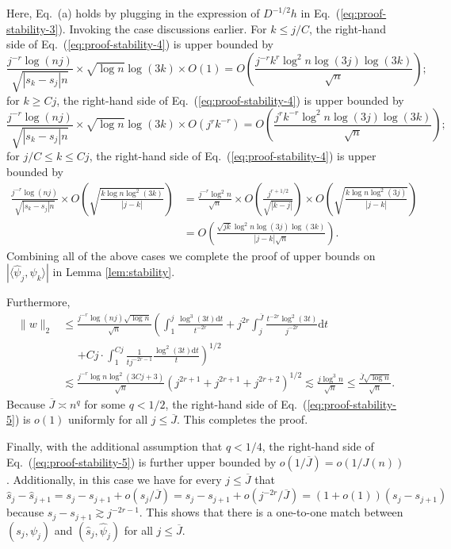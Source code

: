 \documentclass[11pt,a4paper]{article}
\renewcommand{\hat}{\widehat}
\renewcommand{\bar}{\overline}
\theoremstyle{definition}
\theoremstyle{plain}
\theoremstyle{remark}
\newcommand{\ud}{\mathrm d}
\begin{document}
Here, Eq.~(a) holds by plugging in the expression of $D^{-1/2}h$ in Eq.~(\ref{eq:proof-stability-3}).
Invoking the case discussions earlier. For $k\leq j/C$, the right-hand side of Eq.~(\ref{eq:proof-stability-4}) is upper bounded by
$$
 \frac{j^{-r}\log(nj)}{\sqrt{|s_k-s_j|n}}\times \sqrt{\log n}\log(3k)\times O(1) = O\left(\frac{j^{-r}k^r\log^2 n\log(3j)\log(3k)}{\sqrt{n}}\right);
$$
for $k\geq Cj$, the right-hand side of Eq.~(\ref{eq:proof-stability-4}) is upper bounded by 
$$
\frac{j^{-r}\log(nj)}{\sqrt{|s_k-s_j|n}} \times\sqrt{\log n}\log(3k)\times O(j^rk^{-r}) = O\left(\frac{j^rk^{-r}\log^2 n\log(3j)\log(3k)}{\sqrt{n}}\right);
$$
for $j/C\leq k\leq Cj$, the right-hand side of Eq.~(\ref{eq:proof-stability-4}) is upper bounded by
\begin{align*}
\frac{j^{-r}\log(nj)}{\sqrt{|s_k-s_j|n}}\times O\left(\sqrt{\frac{k\log n\log^2(3k)}{|j-k|}}\right) &= \frac{j^{-r}\log^2 n}{\sqrt{n}}\times O\left(\frac{j^{r+1/2}}{\sqrt{|k-j|}}\right)\times O\left(\sqrt{\frac{k\log n\log^2(3j)}{|j-k|}}\right)\\
&= O\left(\frac{\sqrt{jk}\log^2 n\log(3j)\log(3k)}{|j-k|\sqrt{n}}\right).
\end{align*}
Combining all of the above cases we complete the proof of upper bounds on $|\langle\hat\psi_j,\psi_k\rangle|$ in Lemma \ref{lem:stability}.

Furthermore, 
\begin{align}
\|w\|_2 &\leq \frac{j^{-r}\log (nj)\sqrt{\log n}}{\sqrt{n}}\left(\int_1^j \frac{\log^3(3t)\ud t}{t^{-2r}} + j^{2r}\int_j^{\bar J}\frac{t^{-2r}\log^2(3t)}{j^{-2r}}\ud t \right.\nonumber\\
&\;\;\;\;\;\left.+ Cj\cdot \int_1^{Cj}\frac{1}{tj^{-2r-1}}\frac{\log^2(3t)\ud t}{t}\right)^{1/2}\nonumber\\
&\lesssim \frac{j^{-r}\log n\log^2(3Cj+3)}{\sqrt{n}}\left(j^{2r+1} + j^{2r+1} + j^{2r+2}\right)^{1/2} \lesssim  \frac{j\log^3 n}{\sqrt{n}}\leq \frac{\bar J\sqrt{\log n}}{\sqrt{n}}.\label{eq:proof-stability-5}
\end{align}
Because $\bar J\asymp n^q$ for some $q<1/2$, the right-hand side of Eq.~(\ref{eq:proof-stability-5}) is $o(1)$ uniformly for all $j\leq\bar J$. This completes the proof.

Finally, with the additional assumption that $q<1/4$, the right-hand side of Eq.~(\ref{eq:proof-stability-5}) is further upper bounded by $o(1/\bar J)=o(1/J(n))$. 
Additionally, in this case we have for every $j\leq \bar J$ that $\hat s_j-\hat s_{j+1} = s_j-s_{j+1}+o(s_j/\bar J)=s_j-s_{j+1}+o(j^{-2r}/\bar J) = (1+o(1))(s_j-s_{j+1})$ because $s_j-s_{j+1}\gtrsim j^{-2r-1}$.
This shows that there is a one-to-one match between $(s_j,\psi_j)$ and $(\hat s_j,\hat\psi_j)$ for all $j\leq\bar J$.
\end{document}
